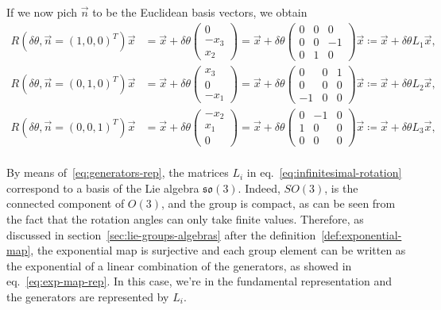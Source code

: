 If we now pich $\vec{n}$ to be the Euclidean basis vectors, we obtain
\begin{subequations}\label{eq:infinitesimal-rotation}
\begin{align}
    R(\delta \theta, \vec{n} = (1,0,0)^T) \vec{x} &= \vec{x} + \delta \theta \begin{pmatrix} 0 \\ -x_3 \\ x_2 \end{pmatrix} = \vec{x} + \delta \theta 
    \begin{pmatrix}
        0 & 0 & 0 \\
        0 & 0 & -1 \\
        0 & 1 & 0
    \end{pmatrix}
    \vec{x} \coloneq \vec{x} + \delta \theta L_1 \vec{x} ,\\
    R(\delta \theta, \vec{n} = (0,1,0)^T) \vec{x} &= \vec{x} + \delta \theta \begin{pmatrix} x_3 \\ 0 \\ -x_1 \end{pmatrix} = \vec{x} + \delta \theta 
    \begin{pmatrix}
        0 & 0 & 1 \\
        0 & 0 & 0 \\
        -1 & 0 & 0
    \end{pmatrix}
    \vec{x} \coloneq \vec{x} + \delta \theta L_2 \vec{x} ,\\
    R(\delta \theta, \vec{n} = (0,0,1)^T) \vec{x} &= \vec{x} + \delta \theta \begin{pmatrix} -x_2 \\ x_1 \\ 0 \end{pmatrix} = \vec{x} + \delta \theta 
    \begin{pmatrix}
        0 & -1 & 0 \\
        1 & 0 & 0 \\
        0 & 0 & 0
    \end{pmatrix}
    \vec{x} \coloneq \vec{x} + \delta \theta L_3 \vec{x} ,\\
\end{align}
\end{subequations}

By means of~\eqref{eq:generators-rep}, the matrices $L_i$ in eq.~\eqref{eq:infinitesimal-rotation} correspond to a basis of the Lie algebra $\mathfrak{so}(3)$. Indeed, $SO(3)$, is the connected component of $O(3)$, and the group is compact, as can be seen from the fact that the rotation angles can only take finite values. Therefore, as discussed in section~\ref{sec:lie-groups-algebras} after the definition~\ref{def:exponential-map}, the exponential map is surjective and each group element can be written as the exponential of a linear combination of the generators, as showed in eq.~\eqref{eq:exp-map-rep}. In this case, we're in the fundamental representation and the generators are represented by $L_i$.

